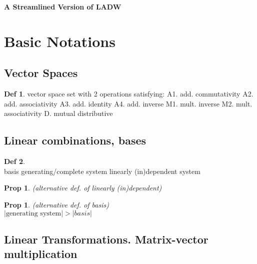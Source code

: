 \documentclass[hidelinks]{article}
\theoremstyle{definition}
\newtheorem*{defin}{Def}
\theoremstyle{plain}
\newtheorem{proposition}[theorem]{Prop}
\theoremstyle{remark}
\begin{document}
\begin{center}
\LARGE\textbf{A Streamlined Version of LADW}\newline
\end{center}

\section{Basic Notations}

\subsection{Vector Spaces}
\begin{defin}vector space\newline
set with 2 operations satisfying: \newline
\indent A1. add. commutativity
\indent A2. add. associativity
\indent A3. add. identity
\indent A4. add. inverse \newline
\indent M1. mult. inverse
\indent M2. mult. associativity \newline
\indent D. mutual distributive
\end{defin}

\subsection{Linear combinations, bases}
\begin{defin}~\\
basis \newline
generating/complete system \newline
linearly (in)dependent system
\end{defin}

\begin{proposition} (alternative def. of linearly (in)dependent)~\\

\end{proposition}

\begin{proposition} (alternative def. of basis)~\\
$|\textrm{generating system}|>|basis|$
\end{proposition}

\subsection{Linear Transformations. Matrix-vector multiplication}
\end{document}
